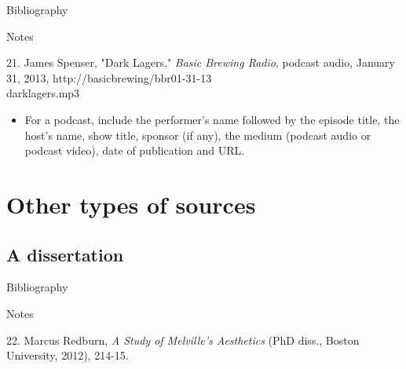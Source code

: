 \begin{center}{Bibliography}\end{center}

\begin{singlespace}
\noindent{}
\end{singlespace}

\begin{center}{Notes}\end{center} 

\begin{singlespace}
\noindent\hspace{1.2cm}21. James Spenser, "Dark
Lagers," \emph{Basic Brewing Radio}, podcast audio, January 31, 2013,
http://basicbrewing/bbr01-31-13\\darklagers.mp3
\end{singlespace}

\begin{itemize}\item For a podcast, include the performer's name followed by the
episode title, the host's name, show title, sponsor (if any), the medium
(podcast audio or podcast video), date of publication and URL.\end{itemize}

\section{Other types of sources}

\subsection{A dissertation}

\begin{center}{Bibliography}\end{center}

\begin{singlespace}
\end{singlespace}

\begin{center}{Notes}\end{center} 

\begin{singlespace}
\noindent\hspace{1.2cm}22. Marcus Redburn, \emph{A
Study of Melville's Aesthetics} (PhD diss., Boston University, 2012), 214-15.
\end{singlespace}

